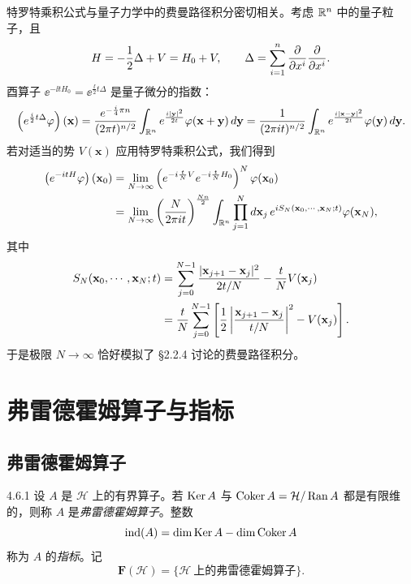 特罗特乘积公式与量子力学中的费曼路径积分密切相关。考虑 $\mathbb{R}^n$ 中的量子粒子，且
\[
H=-\frac12\Delta+V=H_0+V,\qquad
\Delta=\sum_{i=1}^n\frac{\partial}{\partial x^i}\frac{\partial}{\partial x^i}.
\]
酉算子 $\ee^{-\ii tH_0}=\ee^{\frac{\ii}{2}t\Delta}$ 是量子微分的指数：
\[
\left(e^{\frac{i}{2}t\Delta}\varphi\right)(\mathbf{x})
=\frac{e^{-\frac{i}{4}\pi n}}{(2\pi t)^{n/2}}
\int_{\mathbb{R}^n}e^{\frac{i\lvert \mathbf{y}\rvert^2}{2t}}\varphi(\mathbf{x}+\mathbf{y})\,d\mathbf{y}
=\frac{1}{(2\pi i t)^{n/2}}
\int_{\mathbb{R}^n}e^{\frac{i\lvert \mathbf{x}-\mathbf{y}\rvert^2}{2t}}\varphi(\mathbf{y})\,d\mathbf{y}.
\]
若对适当的势 $V(\mathbf{x})$ 应用特罗特乘积公式，我们得到
\begin{align*}
\left(e^{-i tH}\varphi\right)(\mathbf{x}_0)
&=\lim_{N\to\infty}\left(e^{-i\frac tN V}e^{-i\frac tN H_0}\right)^N\varphi(\mathbf{x}_0)\\
&=\lim_{N\to\infty}\left(\frac{N}{2\pi i t}\right)^{\frac{Nn}{2}}
\int_{\mathbb{R}^n}\prod_{j=1}^Nd\mathbf{x}_j\,
e^{i S_N(\mathbf{x}_0,\cdots,\mathbf{x}_N;t)}\varphi(\mathbf{x}_N),
\end{align*}
其中
\begin{align*}
S_N(\mathbf{x}_0,\cdots,\mathbf{x}_N;t)
&=\sum_{j=0}^{N-1}\frac{\lvert \mathbf{x}_{j+1}-\mathbf{x}_j\rvert^2}{2t/N}
-\frac tN V(\mathbf{x}_j)\\
&=\frac tN\sum_{j=0}^{N-1}\left[
\frac12\left|\frac{\mathbf{x}_{j+1}-\mathbf{x}_j}{t/N}\right|^2-V(\mathbf{x}_j)\right].
\end{align*}
于是极限 $N\to\infty$ 恰好模拟了 §2.2.4 讨论的费曼路径积分。


\section{弗雷德霍姆算子与指标}

\subsection{弗雷德霍姆算子}

\begin{definition}{4.6.1}
  设 $A$ 是 $\mathcal{H}$ 上的有界算子。若 $\operatorname{Ker} A$ 与 $\operatorname{Coker}A=\mathcal{H}/\operatorname{Ran} A$ 都是有限维的，则称 $A$ 是\emph{弗雷德霍姆算子}。整数
  \[
  \operatorname{ind}(A)=\dim\operatorname{Ker} A-\dim\operatorname{Coker}A
  \]
  称为 $A$ 的\emph{指标}。记
  \[
  \mathbf{F}(\mathcal{H})=\{\mathcal{H}\ \text{上的弗雷德霍姆算子}\}.
  \]
\end{definition}

